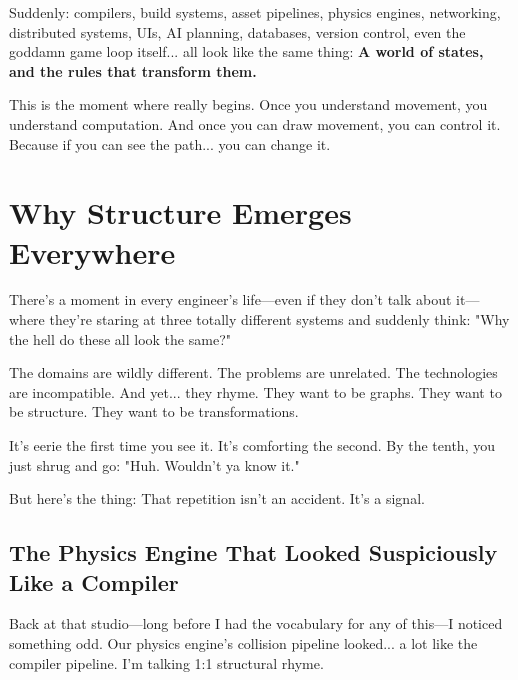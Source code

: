 Suddenly: compilers, build systems, asset pipelines, physics engines, networking, distributed systems, UIs, AI planning, databases, version control, even the goddamn game loop itself... all look like the same thing: \textbf{A world of states, and the rules that transform them.}

This is the moment where \COMPUTER{} really begins. Once you understand movement, you understand computation. And once you can draw movement, you can control it. Because if you can see the path... you can change it.

\section{Why Structure Emerges Everywhere}
\label{sec:why-structure-emerges}

There's a moment in every engineer's life—even if they don't talk about it—where they're staring at three totally different systems and suddenly think: "Why the hell do these all look the same?"

The domains are wildly different. The problems are unrelated. The technologies are incompatible. And yet... they rhyme. They want to be graphs. They want to be structure. They want to be transformations.

It's eerie the first time you see it. It's comforting the second. By the tenth, you just shrug and go: "Huh. Wouldn't ya know it."

But here's the thing: That repetition isn't an accident. It's a signal.

\subsection{The Physics Engine That Looked Suspiciously Like a Compiler}
Back at that studio—long before I had the vocabulary for any of this—I noticed something odd. Our physics engine's collision pipeline looked... a lot like the compiler pipeline. I'm talking 1:1 structural rhyme.

